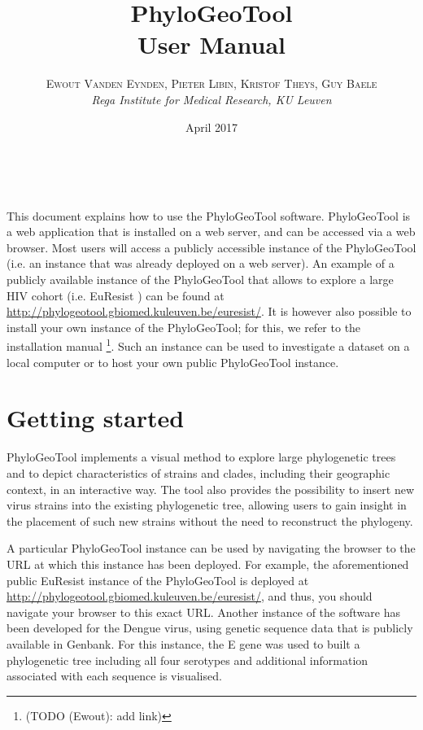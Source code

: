 \documentclass[a4paper, 11pt]{article} %
\title{\textbf{PhyloGeoTool}\\ %
User Manual} %
\author{\textsc{Ewout Vanden Eynden, Pieter Libin, Kristof Theys, Guy Baele} %
\\{\textit{Rega Institute for Medical Research, KU Leuven}}} %
\date{April 2017} %
\makeatletter
\renewcommand{\maketitle}{ %
\begin{flushright} %
{\LARGE\@title} %

\vspace{50pt} %

{\large\@author} %
\\\@date %

\vspace{40pt} %
\end{flushright}
}
\makeatother
\begin{document}
\maketitle %


\vspace{30pt} %

\tableofcontents
\newpage

This document explains how to use the PhyloGeoTool software. PhyloGeoTool is a web application that is installed on a web server, and can be accessed via a web browser. 
Most users will access a publicly accessible instance of the PhyloGeoTool (i.e. an instance that was already deployed on a web server). 
An example of a publicly available instance of the PhyloGeoTool that allows to explore a large HIV cohort (i.e. EuResist \cite{Zazzi2012}) can be found at \url{http://phylogeotool.gbiomed.kuleuven.be/euresist/}.
It is however also possible to install your own instance of the PhyloGeoTool; for this, we refer to the installation manual \footnote{(TODO (Ewout): add link)}. Such an instance can be used to investigate a dataset on a local computer or to host your own public PhyloGeoTool instance.


\section{Getting started}

PhyloGeoTool implements a visual method to explore large phylogenetic trees and to depict characteristics of strains and clades, including their geographic context, in an interactive way.
The tool also provides the possibility to insert new virus strains into the existing phylogenetic tree, allowing users to gain insight in the placement of such new strains without the need to reconstruct the phylogeny.

A particular PhyloGeoTool instance can be used by navigating the browser to the URL at which this instance has been deployed. For example, the aforementioned public EuResist instance of the PhyloGeoTool is deployed at \url{http://phylogeotool.gbiomed.kuleuven.be/euresist/}, and thus, you should navigate your browser to this exact URL. Another instance of the software has been developed for the Dengue virus, using genetic sequence data that is publicly available in Genbank. For this instance, the E gene was used to built a phylogenetic tree including all four serotypes and additional information associated with each sequence is visualised.  
\end{document}
